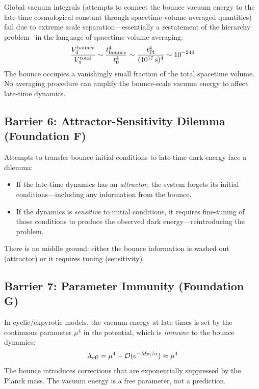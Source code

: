 \documentclass[aps,prd,twocolumn,superscriptaddress,showpacs,preprintnumbers,nofootinbib,longbibliography,floatfix]{revtex4-2}
\newcommand{\MPl}{M_{\rm Pl}}
\begin{document}
Global vacuum integrals (attempts to connect the bounce vacuum energy to the late-time cosmological constant through spacetime-volume-averaged quantities) fail due to extreme scale separation---essentially a restatement of the hierarchy problem~\cite{Weinberg1989} in the language of spacetime volume averaging:
\begin{equation}
\frac{V_4^{\rm bounce}}{V_4^{\rm total}} \sim \frac{t_{\rm bounce}^4}{t_0^4} \sim \frac{t_{\rm Pl}^4}{(10^{17}\,\text{s})^4} \sim 10^{-244}
\end{equation}
The bounce occupies a vanishingly small fraction of the total spacetime volume. No averaging procedure can amplify the bounce-scale vacuum energy to affect late-time dynamics.

\subsection{Barrier 6: Attractor-Sensitivity Dilemma (Foundation F)}

Attempts to transfer bounce initial conditions to late-time dark energy face a dilemma:
\begin{itemize}
\item If the late-time dynamics has an \emph{attractor}, the system forgets its initial conditions---including any information from the bounce.
\item If the dynamics is \emph{sensitive} to initial conditions, it requires fine-tuning of those conditions to produce the observed dark energy---reintroducing the problem.
\end{itemize}
There is no middle ground: either the bounce information is washed out (attractor) or it requires tuning (sensitivity).

\subsection{Barrier 7: Parameter Immunity (Foundation G)}

In cyclic/ekpyrotic models, the vacuum energy at late times is set by the continuous parameter $\mu^4$ in the potential, which is \emph{immune} to the bounce dynamics:
\begin{equation}
\Lambda_{\rm eff} = \mu^4 + \mathcal{O}(e^{-\MPl/\sigma}) \approx \mu^4
\end{equation}
The bounce introduces corrections that are exponentially suppressed by the Planck mass. The vacuum energy is a free parameter, not a prediction.
\end{document}
